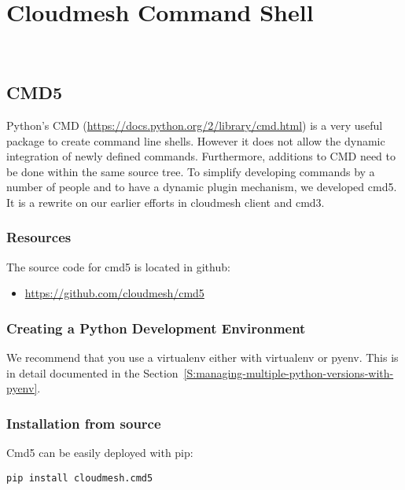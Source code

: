 \chapter{Cloudmesh Command Shell}
\label{C:python-cmd5}

\FILENAME\

\section{CMD5}\label{cmd5}

Python's CMD (\url{https://docs.python.org/2/library/cmd.html}) is a
very useful package to create command line shells. However it does not
allow the dynamic integration of newly defined commands. Furthermore,
additions to CMD need to be done within the same source tree. To
simplify developing commands by a number of people and to have a
dynamic plugin mechanism, we developed cmd5. It is a rewrite on our
earlier efforts in cloudmesh client and cmd3.

\subsection{Resources}

The source code for cmd5 is located in github:

\begin{itemize}

\item
  \url{https://github.com/cloudmesh/cmd5}
\end{itemize}

\subsection{Creating a Python Development
Environment}\label{creating-a-python-development-environment}

We recommend that you use a virtualenv either with virtualenv or
pyenv.  This is in detail documented in the
Section~\ref{S:managing-multiple-python-versions-with-pyenv}.

\subsection{Installation from source}\label{installation-from-source}

Cmd5 can be easily deployed with pip:

\begin{verbatim}
pip install cloudmesh.cmd5
\end{verbatim}

